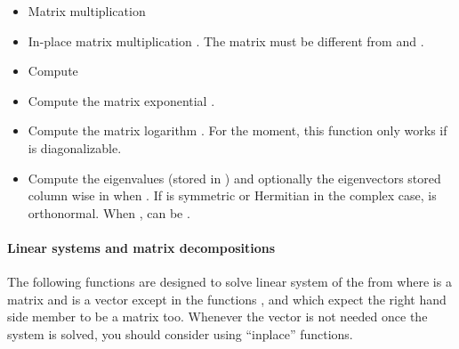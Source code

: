 \begin{itemize}
\item {} 
  \sshortdescribe Matrix multiplication  

\item {} 
    \sshortdescribe In-place matrix multiplication  . The
    matrix  must be different from  and .

\item {}
  \sshortdescribe Compute 
\item {}
  \sshortdescribe Compute the matrix exponential .

\item {}
  \sshortdescribe Compute the matrix logarithm . For the
  moment, this function only works if  is diagonalizable.

\item {}
  \sshortdescribe Compute the eigenvalues (stored in ) and optionally
  the eigenvectors stored column wise in  when
  . If  is symmetric or Hermitian in the
  complex case,  is orthonormal. When ,
   can be .
\end{itemize}


\paragraph{Linear systems and matrix decompositions}

The following functions are designed to solve linear system of the from  where  is a matrix and  is a vector except in the functions
,  and
 which expect the right hand side member to be a
matrix too. Whenever the vector  is not needed once the system is solved,
you should consider using ``inplace'' functions.


